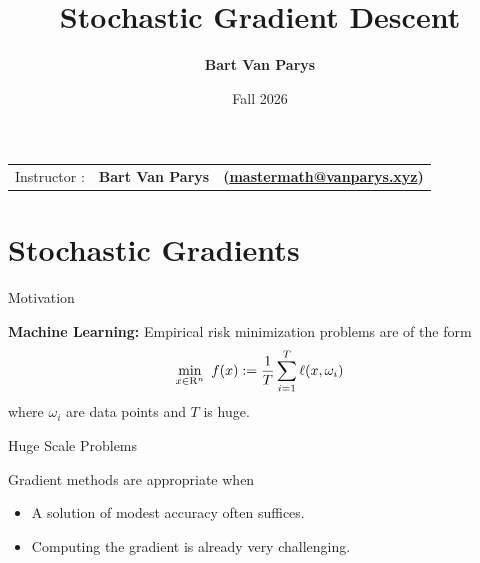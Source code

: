 \documentclass[9pt]{beamer}
\title[Continuous Optimization]{Stochastic Gradient Descent}
\author[]{\textbf{Bart Van Parys}}
\date[]{Fall 2026}
\begin{document}
\begin{frame}  

  \maketitle

  \vspace{-2em}
  
    \begin{center}
    \begin{tabular}{lll}
      Instructor : & \textbf{Bart Van Parys} & \textbf{(\href{mailto:mastermath@vanparys.xyz}{mastermath@vanparys.xyz})}
    \end{tabular}
  \end{center}
  
\end{frame}

\section{Stochastic Gradients}

\begin{frame}{Motivation}

  \textbf{Machine Learning:}
  Empirical risk minimization problems are of the form
  \[
    \min_{x\in\mathrm{R}^n} ~f(x) := \frac{1}{T} \sum_{i=1}^T \ell(x, \omega_i)
  \]
  where $\omega_i$ are data points and $T$ is huge. 

  \vfill

\end{frame}

\begin{frame}{Huge Scale Problems}

  \begin{algorithm}[H]
    \caption{Gradient Descent}
  \end{algorithm}

  \vfill

  Gradient methods are appropriate when
  \begin{itemize}
    \setlength\itemsep{1em}
  \item A solution of modest accuracy often suffices.
  \item Computing the gradient is already very challenging.
  \end{itemize}

  \vfill

\end{frame}
\end{document}
